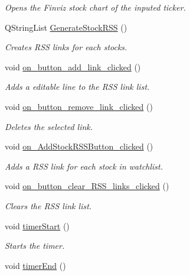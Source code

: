 \begin{DoxyCompactItemize}
\begin{DoxyCompactList}\small\item\em Opens the Finviz stock chart of the inputed ticker. \end{DoxyCompactList}\item 
Q\+String\+List \hyperlink{class_t_k_r_t_a_p_aa8df0b689d8e9c9ca53e040e55ae96c4}{Generate\+Stock\+R\+S\+S} ()
\begin{DoxyCompactList}\small\item\em Creates R\+S\+S links for each stocks. \end{DoxyCompactList}\item 
void \hyperlink{class_t_k_r_t_a_p_a3d229ca32c81efcd046e2cc73c29455a}{on\+\_\+button\+\_\+add\+\_\+link\+\_\+clicked} ()
\begin{DoxyCompactList}\small\item\em Adds a editable line to the R\+S\+S link list. \end{DoxyCompactList}\item 
void \hyperlink{class_t_k_r_t_a_p_a9d26be9315aafb9afc2a134ea9d1ed0b}{on\+\_\+button\+\_\+remove\+\_\+link\+\_\+clicked} ()
\begin{DoxyCompactList}\small\item\em Deletes the selected link. \end{DoxyCompactList}\item 
void \hyperlink{class_t_k_r_t_a_p_ad764cc0d854eb1cf61ad741de1b78368}{on\+\_\+\+Add\+Stock\+R\+S\+S\+Button\+\_\+clicked} ()
\begin{DoxyCompactList}\small\item\em Adds a R\+S\+S link for each stock in watchlist. \end{DoxyCompactList}\item 
void \hyperlink{class_t_k_r_t_a_p_a67ebb1c57c2e2a05a7750e0e42d1b500}{on\+\_\+button\+\_\+clear\+\_\+\+R\+S\+S\+\_\+links\+\_\+clicked} ()
\begin{DoxyCompactList}\small\item\em Clears the R\+S\+S link list. \end{DoxyCompactList}\item 
void \hyperlink{class_t_k_r_t_a_p_adb0ea6e18fbf661f2bf52655f552b907}{timer\+Start} ()
\begin{DoxyCompactList}\small\item\em Starts the timer. \end{DoxyCompactList}\item 
void \hyperlink{class_t_k_r_t_a_p_a6bdc036a4c99e281cc12fb7ab81e8922}{timer\+End} ()

\end{DoxyCompactItemize}
